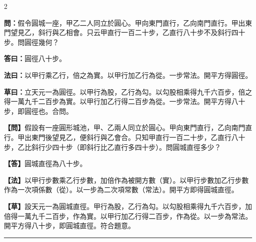 \documentclass[11pt,a4paper]{article}
\newcommand{\longline}{\noindent\rule{\textwidth}{0.4pt}}
\newcommand{\wenC}[1]{\par\noindent\textbf{\textcolor{probcolor}{問：}}{#1}\par}
\newcommand{\daC}[1]{\par\noindent\textbf{\textcolor{anscolor}{答曰：}}{#1}\par}
\newcommand{\fayueC}[1]{\par\noindent\textbf{\textcolor{methodcolor}{法曰：}}{#1}\par}
\newcommand{\caoyueC}[1]{\par\noindent\textbf{草曰：}{#1}\par}
\newcommand{\wenM}[1]{\par\noindent\textbf{\textcolor{probcolor}{【問】}}{#1}\par}
\newcommand{\daM}[1]{\par\noindent\textbf{\textcolor{anscolor}{【答】}}{#1}\par}
\newcommand{\fayueM}[1]{\par\noindent\textbf{\textcolor{methodcolor}{【法】}}{#1}\par}
\newcommand{\caoyueM}[1]{\par\noindent\textbf{【草】}{#1}\par}
\begin{document}
\begin{paracol}{2}

\wenC{假令圓城一座，甲乙二人同立於圓心。甲向東門直行，乙向南門直行。甲出東門望見乙，斜行與乙相會。只云甲直行一百二十步，乙直行八十步不及斜行四十步。問圓徑幾何？}

\daC{圓徑八十步。}

\fayueC{以甲行乘乙行，倍之為實。以甲行加乙行為從。一步常法。開平方得圓徑。}

\caoyueC{立天元一為圓徑。以甲行為股，乙行為勾。以勾股相乘得九千六百步，倍之得一萬九千二百步為實。以甲行加乙行得二百步為從。一步常法。開平方得八十步，即圓徑也。合問。}

\switchcolumn

\wenM{假設有一座圓形城池，甲、乙兩人同立於圓心。甲向東門直行，乙向南門直行。甲出東門後望見乙，便斜行與乙會合。只知甲直行一百二十步，乙直行八十步，乙比斜行少四十步（即斜行比乙直行多四十步）。問圓城直徑多少？}

\daM{圓城直徑為八十步。}

\fayueM{以甲行步數乘乙行步數，加倍作為被開方數（實）。以甲行步數加乙行步數作為一次項係數（從）。以一步為二次項常數（常法）。開平方即得圓城直徑。}

\caoyueM{設天元一為圓城直徑。甲行為股，乙行為勾。以勾股相乘得九千六百步，加倍得一萬九千二百步，作為實。以甲行加乙行得二百步，作為從。以一步為常法。開平方得八十步，即圓城直徑。符合題意。}

\end{paracol}

\vspace{0.3cm}
\longline
\end{document}
